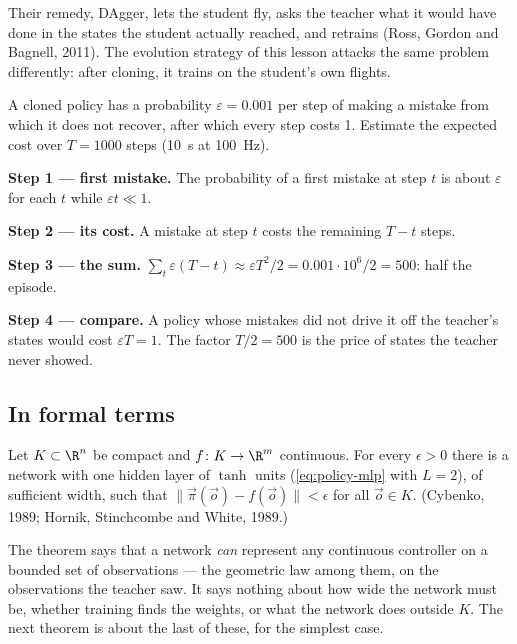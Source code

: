 Their remedy, DAgger, lets the student fly, asks the teacher what it would have done in the states the student actually reached, and retrains (Ross, Gordon and Bagnell, 2011). The evolution strategy of this lesson attacks the same problem differently: after cloning, it trains on the student's own flights.

\begin{example}
\label{ex:policy-compound}
A cloned policy has a probability $\varepsilon = 0.001$ per step of making a mistake from which it does not recover, after which every step costs 1. Estimate the expected cost over $T = 1000$ steps (\SI{10}{s} at \SI{100}{Hz}).

\textbf{Step 1 — first mistake.} The probability of a first mistake at step $t$ is about $\varepsilon$ for each $t$ while $\varepsilon t \ll 1$.

\textbf{Step 2 — its cost.} A mistake at step $t$ costs the remaining $T - t$ steps.

\textbf{Step 3 — the sum.} $\sum_t\varepsilon(T - t) \approx \varepsilon T^2/2 = 0.001 \cdot 10^6/2 = 500$: half the episode.

\textbf{Step 4 — compare.} A policy whose mistakes did not drive it off the teacher's states would cost $\varepsilon T = 1$. The factor $T/2 = 500$ is the price of states the teacher never showed.
\end{example}

\subsection{In formal terms}

\begin{theorem}
\label{thm:policy-uat}
Let $K \subset \R^n$ be compact and $f\colon K \to \R^m$ continuous. For every $\epsilon > 0$ there is a network with one hidden layer of $\tanh$ units (\cref{eq:policy-mlp} with $L = 2$), of sufficient width, such that $\|\vec\pi(\vec o) - f(\vec o)\| < \epsilon$ for all $\vec o \in K$. (Cybenko, 1989; Hornik, Stinchcombe and White, 1989.)
\end{theorem}

The theorem says that a network \emph{can} represent any continuous controller on a bounded set of observations — the geometric law among them, on the observations the teacher saw. It says nothing about how wide the network must be, whether training finds the weights, or what the network does outside $K$. The next theorem is about the last of these, for the simplest case.

